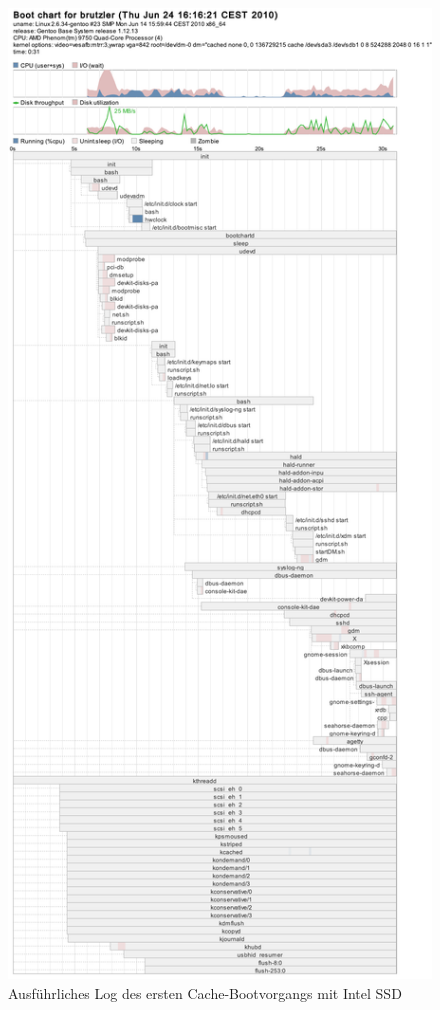 \begin{figure}[H]\centering
	\includegraphics[scale=0.35]{figures/appendix/bootchart-cache1_intel}
    \caption{Ausführliches Log des ersten Cache-Bootvorgangs mit Intel SSD}
    \label{img:bootchart-cache1:intel}
\end{figure}

